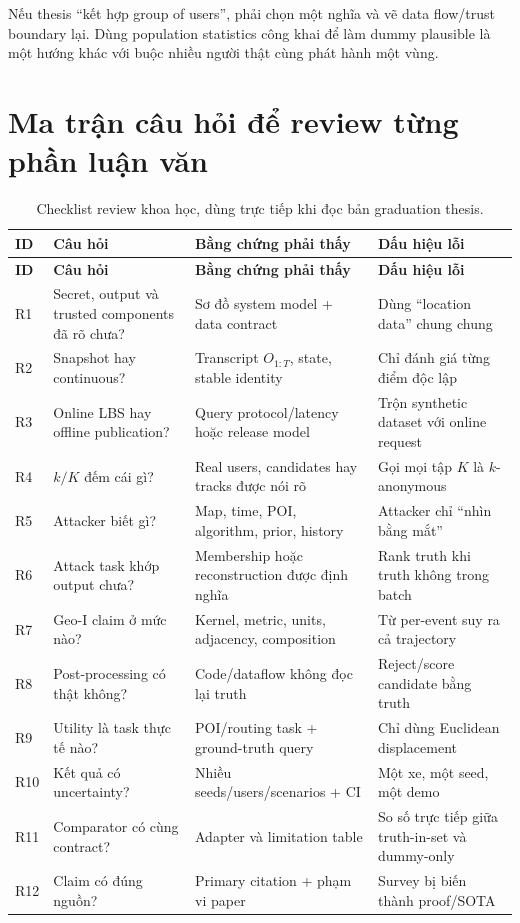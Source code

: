 \documentclass[11pt,a4paper,oneside]{report}
\begin{document}
Nếu thesis ``kết hợp group of users'', phải chọn một nghĩa và vẽ data flow/trust
boundary lại. Dùng population statistics công khai để làm dummy plausible là một
hướng khác với buộc nhiều người thật cùng phát hành một vùng.

\section{Ma trận câu hỏi để review từng phần luận văn}

\begin{longtable}{P{1.2cm}P{4.2cm}P{5.0cm}P{3.7cm}}
\caption{Checklist review khoa học, dùng trực tiếp khi đọc bản graduation thesis.}
\label{tab:review-checklist}\\
\toprule
\textbf{ID} & \textbf{Câu hỏi} & \textbf{Bằng chứng phải thấy} & \textbf{Dấu hiệu lỗi}\\
\midrule
\endfirsthead
\toprule
\textbf{ID} & \textbf{Câu hỏi} & \textbf{Bằng chứng phải thấy} & \textbf{Dấu hiệu lỗi}\\
\midrule
\endhead
R1 & Secret, output và trusted components đã rõ chưa? & Sơ đồ system model + data contract & Dùng ``location data'' chung chung\\
R2 & Snapshot hay continuous? & Transcript $O_{1:T}$, state, stable identity & Chỉ đánh giá từng điểm độc lập\\
R3 & Online LBS hay offline publication? & Query protocol/latency hoặc release model & Trộn synthetic dataset với online request\\
R4 & $k/K$ đếm cái gì? & Real users, candidates hay tracks được nói rõ & Gọi mọi tập $K$ là $k$-anonymous\\
R5 & Attacker biết gì? & Map, time, POI, algorithm, prior, history & Attacker chỉ ``nhìn bằng mắt''\\
R6 & Attack task khớp output chưa? & Membership hoặc reconstruction được định nghĩa & Rank truth khi truth không trong batch\\
R7 & Geo-I claim ở mức nào? & Kernel, metric, units, adjacency, composition & Từ per-event suy ra cả trajectory\\
R8 & Post-processing có thật không? & Code/dataflow không đọc lại truth & Reject/score candidate bằng truth\\
R9 & Utility là task thực tế nào? & POI/routing task + ground-truth query & Chỉ dùng Euclidean displacement\\
R10 & Kết quả có uncertainty? & Nhiều seeds/users/scenarios + CI & Một xe, một seed, một demo\\
R11 & Comparator có cùng contract? & Adapter và limitation table & So số trực tiếp giữa truth-in-set và dummy-only\\
R12 & Claim có đúng nguồn? & Primary citation + phạm vi paper & Survey bị biến thành proof/SOTA\\
\bottomrule
\end{longtable}
\end{document}
